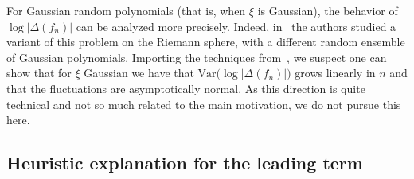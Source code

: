 \documentclass[11pt]{amsart}
\theoremstyle{remark}
\theoremstyle{definition}
\newcommand{\disc}{\Delta}
\begin{document}
        
        For Gaussian random polynomials (that is, when $\xi$ is Gaussian), the behavior of $\log|\disc(f_n)|$ can be analyzed more precisely. Indeed, in~\cite{Michelen-Yakir-log-energy} the authors studied a variant of this problem on the Riemann sphere, with a different random ensemble of Gaussian polynomials. Importing the techniques from~\cite{Michelen-Yakir-log-energy}, we suspect one can show that for $\xi$ Gaussian we have that $\text{Var}\big(\log|\disc(f_n)|\big)$ grows linearly in $n$ and that the fluctuations are asymptotically normal. As this direction is quite technical and not so much related to the main motivation, we do not pursue this here.

        \subsection{Heuristic explanation for the leading term}
\end{document}
